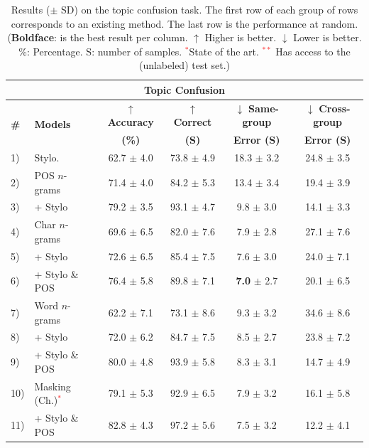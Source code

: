 \documentclass[11pt]{article}
\begin{document}
\begin{table}[htb]
\centering
\caption{\label{tbl:topicConf}Results ($\pm$ SD) on the topic confusion task. The first row of each group of rows corresponds to an existing method. The last row is the performance at random. (\textbf{Boldface}: is the best result per column. $\uparrow$ Higher is better. $\downarrow$ Lower is better. \%: Percentage. S: number of samples. \textcolor{red}{$^{*}$}State of the art. \textcolor{red}{$^{**}$} Has access to the (unlabeled) test set.)
}
\begin{tabular}{l|l|c|ccc}
\hline
\multicolumn{6}{c}{\textbf{Topic Confusion}}    \\\hline
\multirow{2}{*}{\textbf{\#}} & \multirow{2}{*}{\textbf{Models}} & \textbf{$\uparrow$ Accuracy} & $\uparrow$ \textbf{Correct} & $\downarrow$ \textbf{Same-group} & $\downarrow$ \textbf{Cross-group} \\%
&  &  \textbf{(\%)} & \textbf{(S)}& \textbf{Error (S)} & \textbf{Error (S)}  \\\hline %
1) & Stylo. &  62.7 $\pm$ 4.0 & 73.8 $\pm$ 4.9 & 18.3 $\pm$ 3.2 & 24.8 $\pm$ 3.5 \\
\hline
2) & POS $n$-grams & 71.4 $\pm$ 4.0&	84.2 $\pm$ 5.3& 13.4 $\pm$ 3.4	& 	19.4 $\pm$ 3.9\\
3) & \phantom{hi} + Stylo       & 79.2 $\pm$ 3.5 & 93.1 $\pm$ 4.7&   9.8 $\pm$ 3.0 & 14.1 $\pm$ 3.3   \\
\hline
						
4) & Char $n$-grams  & 69.6 $\pm$ 6.5& 82.0 $\pm$ 7.6 & 7.9 $\pm$ 2.8 & 27.1 $\pm$ 7.6  \\			
5) & \phantom{hi}+ Stylo & 72.6 $\pm$ 6.5 & 85.4 $\pm$  7.5& 7.6 $\pm$ 3.0 & 24.0 $\pm$ 7.1 \\
6) &\phantom{hi}+ Stylo \& POS & 76.4 $\pm$ 5.8 & 89.8 $\pm$ 7.1 & \textbf{7.0} $\pm$ 2.7 & 20.1 $\pm$ 6.5 \\\hline

7) & Word $n$-grams & 62.2 $\pm$ 7.1 & 73.1 $\pm$ 8.6 & 9.3 $\pm$ 3.2 & 34.6 $\pm$ 8.6 \\
8) & \phantom{hi}+ Stylo & 72.0 $\pm$ 6.2 & 84.7 $\pm$ 7.5 & 8.5 $\pm$ 2.7 & 23.8 $\pm$ 7.2 \\
9) & \phantom{hi}+ Stylo \& POS  & 80.0 $\pm$ 4.8 & 93.9 $\pm$ 5.8 & 8.3 $\pm$ 3.1 & 14.7 $\pm$ 4.9 \\
\hline\hline
			
10) & Masking (Ch.)\textcolor{red}{$^{*}$} & 79.1 $\pm$ 5.3 & 92.9 $\pm$ 6.5 & 7.9 $\pm$ 3.2 & 16.1 $\pm$ 5.8  \\
11) & \phantom{hi}+ Stylo \& POS & 82.8 $\pm$ 4.3	 & 97.2 $\pm$ 5.6 & 7.5 $\pm$ 3.2 & 12.2 $\pm$ 4.1 \\\hline


\end{tabular}
\end{table}
\end{document}
